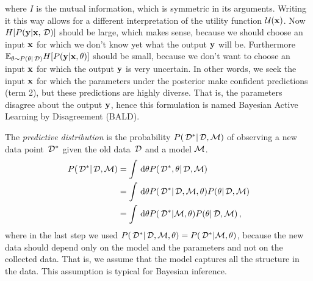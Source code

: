 where $I$ is the mutual information, which is symmetric in its arguments. Writing it this way allows for a different interpretation of the utility function $\mathcal{U}({\bf x})$.
Now $H[{P({\bf y} | {\bf x}, \,\mathcal{D})}]$ should be large, which makes sense, because we should choose an input ${\bf x}$ for which we don't know yet what the output ${\bf y}$ will be.
Furthermore $\mathbb{E}_{\theta \sim {P(\theta| \,\mathcal{D})}} H[{P({\bf y} | {\bf x}, \theta)}]$ should be small, because we don't want to choose an input ${\bf x}$ for which the output ${\bf y}$ is very uncertain.
In other words, we seek the input ${\bf x}$ for which the parameters under the posterior make confident predictions (term 2), but these predictions are highly diverse. That is, the parameters disagree about the output ${\bf y}$, hence this formulation is named Bayesian Active Learning by Disagreement (BALD).

The \emph{predictive distribution} is the probability ${P(\,\mathcal{D}^* | \,\mathcal{D}, \mathcal{M})}$ of observing a new data point $\,\mathcal{D}^*$ given the old data $\,\mathcal{D}$ and a model $\mathcal{M}$.
\begin{align*}
	{P(\,\mathcal{D}^* | \,\mathcal{D}, \mathcal{M})}
	&= \int \,\mathrm{d} \theta
		{P(\,\mathcal{D}^*, \theta| \,\mathcal{D}, \mathcal{M})} \\
	&= \int \,\mathrm{d} \theta
		{P(\,\mathcal{D}^* | \,\mathcal{D}, \mathcal{M}, \theta)}
		{P(\theta| \,\mathcal{D}, \mathcal{M})} \\
	&= \int \,\mathrm{d} \theta
		{P(\,\mathcal{D}^* | \mathcal{M}, \theta)}
		{P(\theta| \,\mathcal{D}, \mathcal{M})} \,,
\end{align*}
where in the last step we used ${P(\,\mathcal{D}^* | \,\mathcal{D}, \mathcal{M}, \theta)} = {P(\,\mathcal{D}^* | \mathcal{M}, \theta)}$, because the new data should depend only on the model and the parameters and not on the collected data. That is, we assume that the model captures all the structure in the data. This assumption is typical for Bayesian inference.
